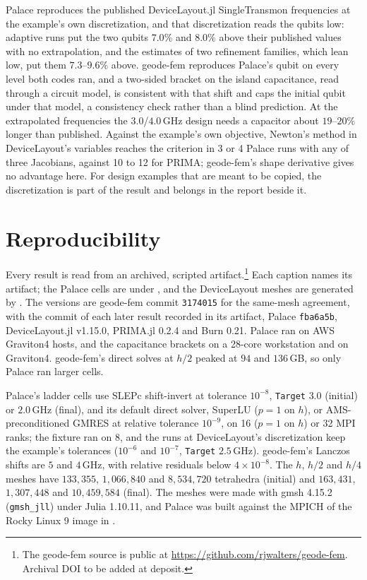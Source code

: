 \documentclass{anvil-paper}
\begin{document}
Palace reproduces the published DeviceLayout.jl SingleTransmon
frequencies at the example's own discretization, and that discretization
reads the qubits low: adaptive runs put the two qubits $7.0\%$ and $8.0\%$
above their published values with no extrapolation, and the estimates of
two refinement families, which lean low, put them $7.3$--$9.6\%$ above. geode-fem
reproduces Palace's qubit on every level both codes ran, and a two-sided
bracket on the island capacitance, read through a circuit model, is
consistent with that shift and caps the initial qubit under that model,
a consistency check rather than a blind prediction. At
the extrapolated frequencies the $3.0$/$4.0$\,GHz design needs a capacitor
about $19$--$20\%$ longer than published. Against the example's own objective, Newton's method in DeviceLayout's
variables reaches the criterion in 3 or 4 Palace runs with any of three
Jacobians, against 10 to 12 for PRIMA; geode-fem's shape derivative gives
no advantage here. For design examples that are meant to be
copied, the discretization is part of the result and belongs in the report
beside it.

\section{Reproducibility}
\label{sec:repro}

Every result is read from an archived, scripted artifact.\footnote{The geode-fem source is public at
\url{https://github.com/rjwalters/geode-fem}. Archival DOI to be added at
deposit.}
Each caption names its artifact; the Palace cells are under
, and the DeviceLayout meshes are
generated by . The versions are geode-fem commit
\texttt{3174015} for the same-mesh agreement, with the commit of each later
result recorded in its artifact, Palace \texttt{fba6a5b}, DeviceLayout.jl
v1.15.0, PRIMA.jl 0.2.4 and Burn 0.21. Palace ran on AWS
Graviton4 hosts, and the capacitance brackets on a 28-core workstation and
on Graviton4. geode-fem's
direct solves at $h/2$ peaked at $94$ and $136$\,GB, so only Palace ran
larger cells.

Palace's ladder cells use SLEPc shift-invert at tolerance $10^{-8}$,
\texttt{Target} $3.0$ (initial) or $2.0$\,GHz (final), and its default
direct solver, SuperLU ($p = 1$ on $h$), or AMS-preconditioned GMRES at relative
tolerance $10^{-9}$, on 16 ($p = 1$ on $h$) or 32 MPI ranks; the fixture ran
on 8, and the runs at DeviceLayout's discretization keep the example's
tolerances ($10^{-6}$ and $10^{-7}$, \texttt{Target} $2.5$\,GHz). geode-fem's Lanczos shifts are
$5$ and $4$\,GHz, with relative residuals below $4\times10^{-8}$.
The $h$, $h/2$ and $h/4$ meshes have $133{,}355$, $1{,}066{,}840$ and
$8{,}534{,}720$ tetrahedra (initial) and $163{,}431$, $1{,}307{,}448$ and
$10{,}459{,}584$ (final). The meshes were made
with gmsh 4.15.2 (\texttt{gmsh\_jll}) under Julia 1.10.11, and Palace was
built against the MPICH of the Rocky Linux 9 image in
.
\end{document}
